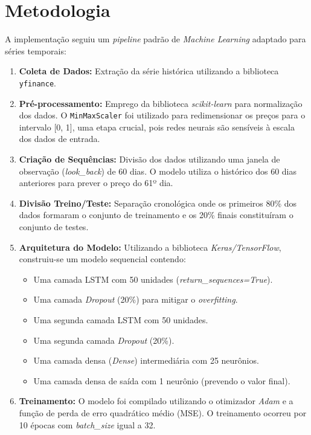 \documentclass[12pt,a4paper]{article}
\begin{document}
\section{Metodologia}
A implementação seguiu um \textit{pipeline} padrão de \textit{Machine Learning} adaptado para séries temporais:
\begin{enumerate}
    \item \textbf{Coleta de Dados:} Extração da série histórica utilizando a biblioteca \texttt{yfinance}.
    \item \textbf{Pré-processamento:} Emprego da biblioteca \textit{scikit-learn} para normalização dos dados. O \texttt{MinMaxScaler} foi utilizado para redimensionar os preços para o intervalo [0, 1], uma etapa crucial, pois redes neurais são sensíveis à escala dos dados de entrada.
    \item \textbf{Criação de Sequências:} Divisão dos dados utilizando uma janela de observação (\textit{look\_back}) de 60 dias. O modelo utiliza o histórico dos 60 dias anteriores para prever o preço do 61º dia.
    \item \textbf{Divisão Treino/Teste:} Separação cronológica onde os primeiros 80\% dos dados formaram o conjunto de treinamento e os 20\% finais constituíram o conjunto de testes.
    \item \textbf{Arquitetura do Modelo:} Utilizando a biblioteca \textit{Keras/TensorFlow}, construiu-se um modelo sequencial contendo:
    \begin{itemize}
        \item Uma camada LSTM com 50 unidades (\textit{return\_sequences=True}).
        \item Uma camada \textit{Dropout} (20\%) para mitigar o \textit{overfitting}.
        \item Uma segunda camada LSTM com 50 unidades.
        \item Uma segunda camada \textit{Dropout} (20\%).
        \item Uma camada densa (\textit{Dense}) intermediária com 25 neurônios.
        \item Uma camada densa de saída com 1 neurônio (prevendo o valor final).
    \end{itemize}
    \item \textbf{Treinamento:} O modelo foi compilado utilizando o otimizador \textit{Adam} e a função de perda de erro quadrático médio (MSE). O treinamento ocorreu por 10 épocas com \textit{batch\_size} igual a 32.
\end{enumerate}
\end{document}
